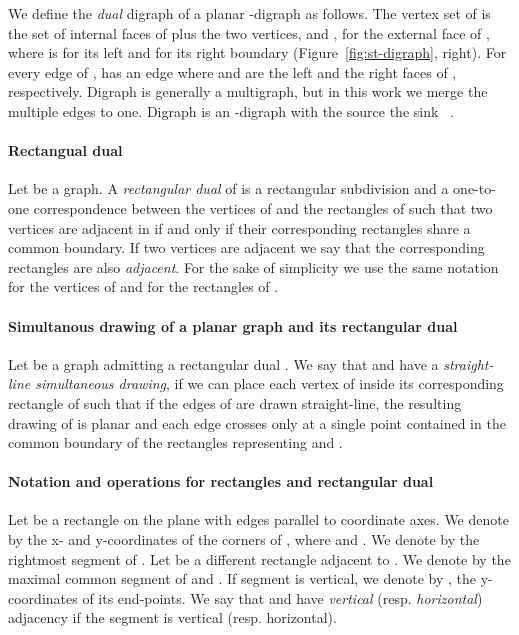 \documentclass{llncs}
\begin{document}
We define the \emph{dual} digraph  of a planar -digraph  as follows. The vertex set of  is the set of internal faces of  plus the two vertices,  and , for the external face of , where  is for its left  and  for its right boundary (Figure~\ref{fig:st-digraph}, right). For every edge  of ,  has an edge  where  and  are the left and the right faces of , respectively.  Digraph  is generally a multigraph, but in this work we merge the multiple edges to one. Digraph  is an -digraph with the source  the sink ~\cite{diBattistaThebook}. 


\paragraph{\bf Rectangual dual}  Let  be a graph. A \emph{rectangular dual}  of  is a rectangular subdivision   and a one-to-one correspondence between the vertices of  and the rectangles of  such that two vertices are adjacent in  if and only if their corresponding rectangles share a common boundary.  If two vertices are adjacent we say that the corresponding rectangles are also \emph{adjacent}. For the sake of simplicity we use the same notation for the vertices of  and for the rectangles of . 


\paragraph{\bf Simultanous drawing of a planar graph and its rectangular dual}
Let  be a graph admitting a rectangular dual . We say that  and  have a \emph{straight-line simultaneous drawing}, if we can place each vertex of  inside its corresponding rectangle of  such that if the edges of  are drawn straight-line, the resulting drawing of  is planar and each edge  crosses  only at a single point contained in the common boundary of the rectangles representing  and .


\paragraph{\bf Notation and operations for rectangles and rectangular dual} Let  be a rectangle on the plane with edges parallel to coordinate axes. We denote by  the x- and y-coordinates of the corners of , where  and . We denote by  the rightmost segment of . Let  be a different rectangle adjacent to . We
denote by  the maximal common segment of  and .  If segment  is vertical, we denote by ,   the y-coordinates of its end-points. We say that  and  have \emph{vertical} (resp. \emph{horizontal}) adjacency if the segment  is vertical (resp. horizontal).
\end{document}
